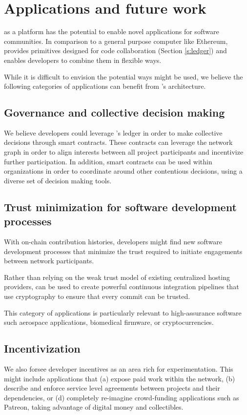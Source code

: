 
\section{Applications and future work}

\oscoin{} as a platform has the potential to enable novel applications for
software communities. In comparison to a general purpose computer like
Ethereum, \oscoin{} provides primitives designed for code collaboration
(Section \ref{s:ledger}) and enables developers to combine them in flexible ways.

While it is difficult to envision the potential ways \oscoin{} might be used, we
believe the following categories of applications can benefit from \oscoin{}’s
architecture.

\subsection{Governance and collective decision making}

We believe developers could leverage \oscoin{}’s
ledger in order to make collective decisions through smart contracts. These contracts
can leverage the network graph in
order to align interests between all project participants and incentivize further
participation. In addition, smart contracts can be used within organizations
in order to coordinate around other contentious decisions, using a diverse set of
decision making tools.

\subsection{Trust minimization for software development processes}
With on-chain contribution histories, developers might find new software development processes that
minimize the trust required to initiate engagements between network participants.

Rather than relying on the weak trust model of existing centralized hosting
providers, \oscoin{} can be used to create powerful continuous integration
pipelines that use cryptography to ensure that every commit can be trusted.

This category of applications is particularly relevant to high-assurance
software such aerospace applications, biomedical firmware, or cryptocurrencies.

\subsection{Incentivization}
We also forsee developer incentives as an area rich for experimentation.
This might include applications that (a) expose paid work
within the \oscoin{} network, (b) describe and enforce service level agreements
between projects and their dependencies, or (d) completely re-imagine crowd-funding
applications such as Patreon, taking advantage of digital money and collectibles.


